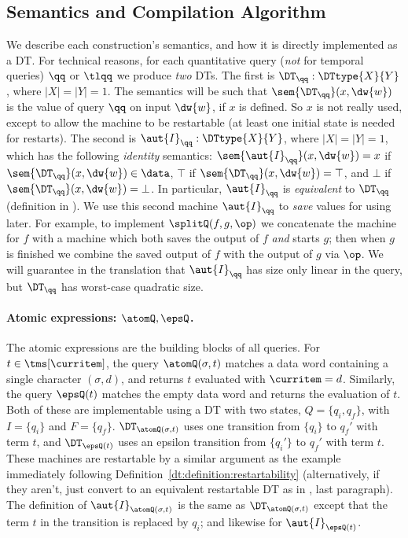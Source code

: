 \subsection{Semantics and Compilation Algorithm}
\label{dt:subsec:rm-compilation}

We describe each construction's semantics, and how it is directly implemented as a DT.
For technical reasons, for each quantitative query (\emph{not} for temporal queries) $\qq$ or $\tlqq$ we produce \emph{two} DTs. The first is $\DT_{\qq}: \DTtype{X}{Y}$, where $|X| = |Y| = 1$. The semantics will be such that $\sem{\DT_{\qq}}(x,\dw{w})$ is the value of query $\qq$ on input $\dw{w}$, if $x$ is defined. So $x$ is not really used, except to allow the machine to be restartable (at least one initial state is needed for restarts). The second is $\aut{I}_{\qq}: \DTtype{X}{Y}$, where $|X|=|Y|=1$, which has the following \emph{identity} semantics: $\sem{\aut{I}_{\qq}}(x,\dw{w}) = x$ if $\sem{\DT_{\qq}}(x,\dw{w}) \in \data$, $\top$ if $\sem{\DT_{\qq}}(x,\dw{w}) = \top$, and $\bot$ if $\sem{\DT_{\qq}}(x,\dw{w}) = \bot$.
In particular, $\aut{I}_{\qq}$ is \emph{equivalent} to $\DT_{\qq}$ (definition in ).
We use this second machine $\aut{I}_{\qq}$ to \emph{save} values for using later. For example, to implement $\splitQ(f,g,\op)$ we concatenate the machine for $f$ with a machine which both saves the output of $f$ \emph{and} starts $g$; then when $g$ is finished we combine the saved output of $f$ with the output of $g$ via $\op$. We will guarantee in the translation that $\aut{I}_{\qq}$ has size only linear in the query, but $\DT_{\qq}$ has worst-case quadratic size.

\paragraph*{Atomic expressions: $\atomQ, \epsQ$.}
The atomic expressions are the building blocks of all queries. For $t \in \tms[\curritem]$, the query $\atomQ(\sigma, t)$ matches a data word containing a single character $(\sigma, d)$, and returns $t$ evaluated with $\curritem = d$. Similarly, the query $\epsQ(t)$ matches the empty data word and returns the evaluation of $t$.
Both of these are implementable using a DT with two states, $Q = \{q_i, q_f\}$, with $I = \{q_i\}$ and $F = \{q_f\}$.
$\DT_{\atomQ(\sigma, t)}$ uses one transition from $\{q_i\}$ to $q_f'$ with term $t$, and $\DT_{\epsQ(t)}$ uses an epsilon transition from $\{q_i'\}$ to $q_f'$ with term $t$.
These machines are restartable by a similar argument as the example immediately following Definition~\ref{dt:definition:restartability} (alternatively, if they aren't, just convert to an equivalent restartable DT as in , last paragraph).
The definition of $\aut{I}_{\atomQ(\sigma, t)}$ is the same as $\DT_{\atomQ(\sigma, t)}$ except that the term $t$ in the transition is replaced by $q_i$; and likewise for $\aut{I}_{\epsQ(t)}$.

